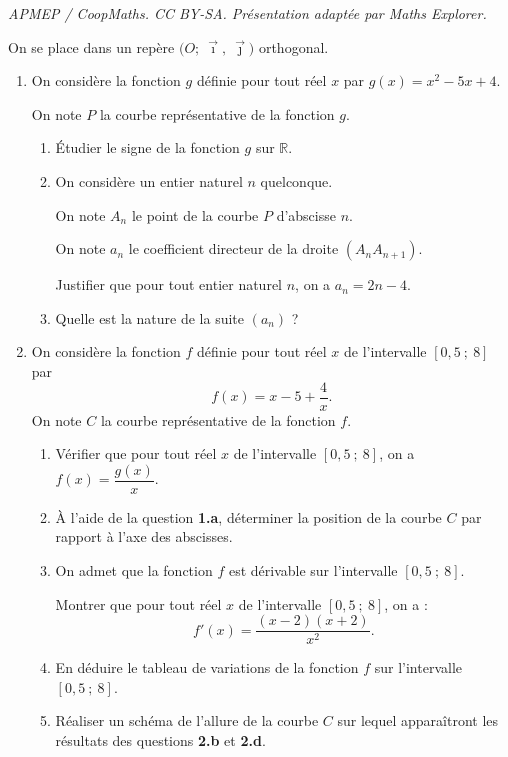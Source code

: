 \documentclass[10pt]{article}
\begin{document}
\noindent\textit{APMEP / CoopMaths. CC BY-SA. Présentation adaptée par Maths Explorer.}\par\medskip
On se place dans un repère $\big(O;~\vec{\imath},~\vec{\jmath}\big)$ orthogonal.

\begin{enumerate}
\item On considère la fonction $g$ définie pour tout réel $x$ par $g(x) = x^2 - 5x + 4$.

On note $P$ la courbe représentative de la fonction $g$.
	\begin{enumerate}
	\item Étudier le signe de la fonction $g$ sur $\mathbb{R}$.
	\item On considère un entier naturel $n$ quelconque.
	
	On note $A_n$ le point de la courbe $P$ d'abscisse $n$.
	
	On note $a_n$ le coefficient directeur de la droite $(A_nA_{n+1})$.

	Justifier que pour tout entier naturel $n$, on a $a_n = 2n - 4$.
	\item Quelle est la nature de la suite $(a_n)$ ?
	\end{enumerate}

\bigskip

\item On considère la fonction $f$ définie pour tout réel $x$ de l'intervalle $[0,5~;~8]$ par
\[f(x) = x - 5 + \dfrac{4}{x}.\]
On note $C$ la courbe représentative de la fonction $f$.
	\begin{enumerate}
	\item Vérifier que pour tout réel $x$ de l'intervalle $[0,5~;~8]$, on a $f(x) = \dfrac{g(x)}{x}$.
	\item À l'aide de la question \textbf{1.a}, déterminer la position de la courbe $C$ par rapport à l'axe des abscisses.
	\item On admet que la fonction $f$ est dérivable sur l'intervalle $[0,5~;~8]$.
	
	Montrer que pour tout réel $x$ de l'intervalle $[0,5~;~8]$, on a :
\[f'(x) = \dfrac{(x - 2)(x + 2)}{x^2}.\]
	\item En déduire le tableau de variations de la fonction $f$ sur l'intervalle $[0,5~;~8]$.
	\item Réaliser un schéma de l'allure de la courbe $C$ sur lequel apparaîtront les résultats des questions \textbf{2.b} et \textbf{2.d}.
	\end{enumerate}
\end{enumerate}
\end{document}

